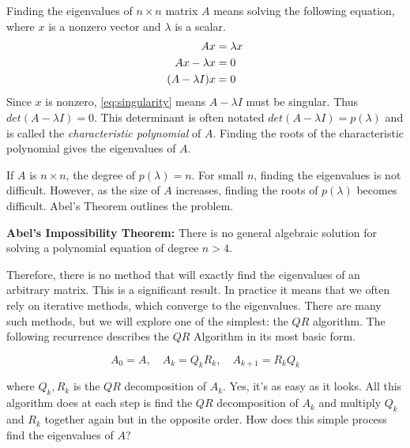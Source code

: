 \label{Ch:EigSolve}


Finding the eigenvalues of $n \times n$ matrix $A$ means solving the following equation, where $x$ is a nonzero vector and $\lambda$ is a scalar.
\begin{align} 
 A x                       &=  \lambda x  \notag \\
A x - \lambda x &= 0 \notag \\
(A - \lambda I)x  &= 0 \label{eq:singularity}
\end{align}
Since $x$ is nonzero, \eqref{eq:singularity} means $A-\lambda I$ must be singular. Thus $det(A-\lambda I) = 0$.  This determinant is often notated $det(A-\lambda I) = p(\lambda)$ and is called the \emph{characteristic polynomial} of $A$. Finding the roots of the characteristic polynomial gives the eigenvalues of $A$.

If $A$ is $n \times n$, the degree of $p(\lambda) = n$.   For small $n$, finding the eigenvalues is not difficult.  However, as the size of $A$ increases, finding the roots of $p(\lambda)$ becomes difficult.  Abel's Theorem  outlines the problem.

\begin{theorem}
\label{Theorem:Abel}
{\bf Abel's Impossibility Theorem:} There is no general algebraic solution for solving a polynomial equation of degree $n>4$.
\end{theorem}

Therefore, there is no method that will exactly find the eigenvalues of an arbitrary matrix. This is a significant result. In practice it means that we often rely on iterative methods, which converge to the eigenvalues. There are many such methods, but we will explore one of the simplest: the $QR$ algorithm. The following recurrence describes the $QR$ Algorithm in its most basic form. 

\begin{equation*}
A_0 = A, \quad A_k = Q_k R_k, \quad A_{k+1} = R_k Q_k
\end{equation*}

where $Q_k, R_k$ is the $QR$ decomposition of $A_k$. Yes, it's as easy as it looks. All this algorithm does at each step is find the $QR$ decomposition of $A_k$ and multiply $Q_k$ and $R_k$ together again but in the opposite order. How does this simple process find the eigenvalues of $A$? 

